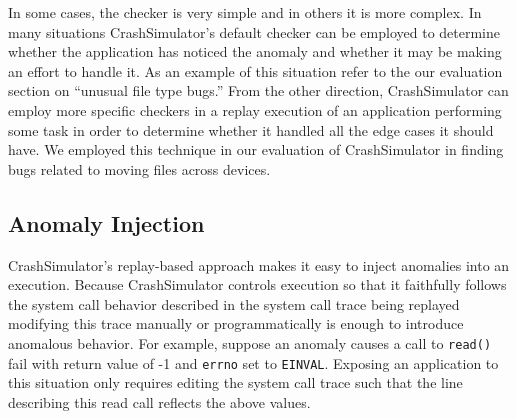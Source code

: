 
    In some cases, %
    the checker is very simple and in others it is more complex.
   In many situations
    CrashSimulator's default checker can be employed to determine
    whether the application has noticed the anomaly and whether it may be making
    an effort to handle it.  As an example of this situation refer to the our
    evaluation section on ``unusual file type bugs.''  From the other direction,
    CrashSimulator can employ more specific checkers in a replay execution of an
    application performing some task in order to determine whether it handled
    all the edge cases it should have.  We employed this technique in our
    evaluation of CrashSimulator in finding bugs related to moving files across
    devices.
    
    \subsection{Anomaly Injection}

    CrashSimulator's replay-based approach makes it easy to inject anomalies
    into an execution.  
    Because CrashSimulator controls execution so that it faithfully
    follows the system call behavior described in the system call trace being
    replayed modifying this trace manually or programmatically is enough to
    introduce anomalous behavior.  For example, suppose an anomaly causes a
    call to {\tt read()} fail with return value of -1 and {\tt errno} set to
    {\tt EINVAL}.  Exposing an application to this situation only requires
    editing the system call trace such that the line describing this read call
    reflects the above values.

